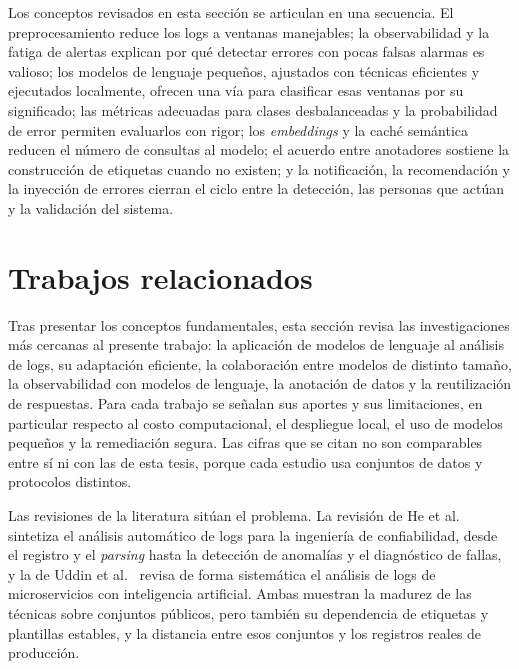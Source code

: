 Los conceptos revisados en esta sección se articulan en una secuencia. El preprocesamiento reduce los logs a ventanas manejables; la observabilidad y la fatiga de alertas explican por qué detectar errores con pocas falsas alarmas es valioso; los modelos de lenguaje pequeños, ajustados con técnicas eficientes y ejecutados localmente, ofrecen una vía para clasificar esas ventanas por su significado; las métricas adecuadas para clases desbalanceadas y la probabilidad de error permiten evaluarlos con rigor; los \textit{embeddings} y la caché semántica reducen el número de consultas al modelo; el acuerdo entre anotadores sostiene la construcción de etiquetas cuando no existen; y la notificación, la recomendación y la inyección de errores cierran el ciclo entre la detección, las personas que actúan y la validación del sistema.

\section{Trabajos relacionados}\label{cap:trabajos_relacionados}

Tras presentar los conceptos fundamentales, esta sección revisa las investigaciones más cercanas al presente trabajo: la aplicación de modelos de lenguaje al análisis de logs, su adaptación eficiente, la colaboración entre modelos de distinto tamaño, la observabilidad con modelos de lenguaje, la anotación de datos y la reutilización de respuestas. Para cada trabajo se señalan sus aportes y sus limitaciones, en particular respecto al costo computacional, el despliegue local, el uso de modelos pequeños y la remediación segura. Las cifras que se citan no son comparables entre sí ni con las de esta tesis, porque cada estudio usa conjuntos de datos y protocolos distintos.

Las revisiones de la literatura sitúan el problema. La revisión de He et al.~\cite{he2021_survey} sintetiza el análisis automático de logs para la ingeniería de confiabilidad, desde el registro y el \textit{parsing} hasta la detección de anomalías y el diagnóstico de fallas, y la de Uddin et al.~\cite{uddin2026_microservice_logs} revisa de forma sistemática el análisis de logs de microservicios con inteligencia artificial. Ambas muestran la madurez de las técnicas sobre conjuntos públicos, pero también su dependencia de etiquetas y plantillas estables, y la distancia entre esos conjuntos y los registros reales de producción.

